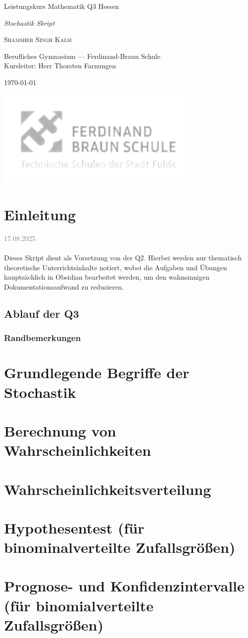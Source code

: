 \documentclass[11pt,a4paper,oneside]{article}
\newcommand{\lessondate}[1]{
	\noindent\hfill\textcolor{gray}{\textsc{#1}} \\
	\vspace{0.5cm}
}
\newcommand{\MakeArtTitle}[4]{%
	\begin{titlepage}
		\vspace*{18mm}
		\begin{center}
			\vspace{12mm}
			{\huge\color{TextCream} #1 \par}
			\vspace{6mm}
			{\Large\itshape\color{AccentBlue!50} #2 \par}
			\vspace{10mm}
			{\Large\scshape\color{TextCream} #3 \par}
			\vspace{6mm}
			{\small\color{MarginalGray} #4 \par}
			\vspace{5mm}
			{\small\color{MarginalGray} \today \par}
		\end{center}
		\vspace{7.5cm}
		\centering
		\includegraphics[width=0.75\textwidth]{2.png} %
	\end{titlepage}
}
\begin{document}
	
	\MakeArtTitle{
		Leistungskurs Mathematik Q3 Hessen}
		{Stochastik Skript}
		{Shamsher Singh Kalsi}
		{Berufliches Gymnasium — Ferdinand-Braun Schule \\ Kursleiter: Herr Thorsten Farnungen}
	
	\tableofcontents
	\bigskip
	\clearpage
	
	
	\section{Einleitung}
	\lessondate{17.08.2025}\\
	Dieses Skript dient als Vorsetzung von der Q2. Hierbei werden nur thematisch theoretische Unterrichtsinhalte notiert, wobei die Aufgaben und Übungen hauptsächlich in Obsidian bearbeitet werden, um den wahnsinnigen Dokumentationsaufwand zu reduzieren. 
	
	\subsection{Ablauf der Q3}
	
	\subsubsection{Randbemerkungen}
	
	
	\section{Grundlegende Begriffe der Stochastik}
	
	\section{Berechnung von Wahrscheinlichkeiten}
	
	\section{Wahrscheinlichkeitsverteilung}
	
	\section{Hypothesentest (für binominalverteilte Zufallsgrößen)}
	
	\section{Prognose- und Konfidenzintervalle (für binomialverteilte Zufallsgrößen)}
	
\end{document}
